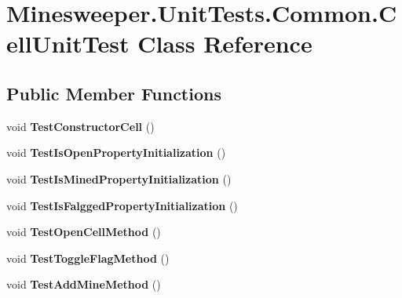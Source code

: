 \hypertarget{class_minesweeper_1_1_unit_tests_1_1_common_1_1_cell_unit_test}{\section{Minesweeper.\+Unit\+Tests.\+Common.\+Cell\+Unit\+Test Class Reference}
\label{class_minesweeper_1_1_unit_tests_1_1_common_1_1_cell_unit_test}
}
\subsection*{Public Member Functions}
\begin{DoxyCompactItemize}
\item 
\hypertarget{class_minesweeper_1_1_unit_tests_1_1_common_1_1_cell_unit_test_a588282b37cb05f2f5c6e61796a600a02}{void {\bfseries Test\+Constructor\+Cell} ()}\label{class_minesweeper_1_1_unit_tests_1_1_common_1_1_cell_unit_test_a588282b37cb05f2f5c6e61796a600a02}

\item 
\hypertarget{class_minesweeper_1_1_unit_tests_1_1_common_1_1_cell_unit_test_ac1ee945d62b5da9e0cc1c8b032561498}{void {\bfseries Test\+Is\+Open\+Property\+Initialization} ()}\label{class_minesweeper_1_1_unit_tests_1_1_common_1_1_cell_unit_test_ac1ee945d62b5da9e0cc1c8b032561498}

\item 
\hypertarget{class_minesweeper_1_1_unit_tests_1_1_common_1_1_cell_unit_test_a41fdb4086cc1af8ba993555a5a461274}{void {\bfseries Test\+Is\+Mined\+Property\+Initialization} ()}\label{class_minesweeper_1_1_unit_tests_1_1_common_1_1_cell_unit_test_a41fdb4086cc1af8ba993555a5a461274}

\item 
\hypertarget{class_minesweeper_1_1_unit_tests_1_1_common_1_1_cell_unit_test_a34004aa69d89969444a6b708fcfeeb1b}{void {\bfseries Test\+Is\+Falgged\+Property\+Initialization} ()}\label{class_minesweeper_1_1_unit_tests_1_1_common_1_1_cell_unit_test_a34004aa69d89969444a6b708fcfeeb1b}

\item 
\hypertarget{class_minesweeper_1_1_unit_tests_1_1_common_1_1_cell_unit_test_af731c81ffc0f3c9069926bbe3a854fc4}{void {\bfseries Test\+Open\+Cell\+Method} ()}\label{class_minesweeper_1_1_unit_tests_1_1_common_1_1_cell_unit_test_af731c81ffc0f3c9069926bbe3a854fc4}

\item 
\hypertarget{class_minesweeper_1_1_unit_tests_1_1_common_1_1_cell_unit_test_a0ae28825bc4e0381a0550a600daca2ec}{void {\bfseries Test\+Toggle\+Flag\+Method} ()}\label{class_minesweeper_1_1_unit_tests_1_1_common_1_1_cell_unit_test_a0ae28825bc4e0381a0550a600daca2ec}

\item 
\hypertarget{class_minesweeper_1_1_unit_tests_1_1_common_1_1_cell_unit_test_a53068361b880d245a7529b3c799dd58d}{void {\bfseries Test\+Add\+Mine\+Method} ()}\label{class_minesweeper_1_1_unit_tests_1_1_common_1_1_cell_unit_test_a53068361b880d245a7529b3c799dd58d}

\end{DoxyCompactItemize}


